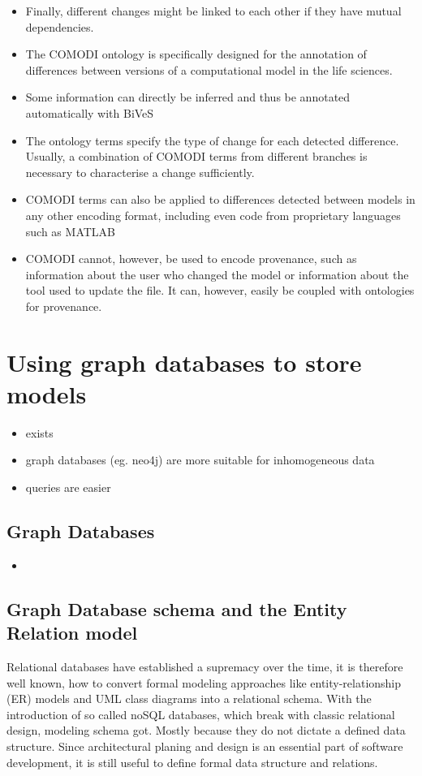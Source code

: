 \begin{itemize}
		\item Finally, different changes might be linked to each other if they have mutual dependencies.
		\item The COMODI ontology is specifically designed for the annotation of differences between versions of a computational model in the life sciences.
		\item Some information can directly be inferred and thus be annotated automatically with BiVeS
		\item  The ontology terms specify the type of change for each detected difference. Usually, a combination of COMODI terms from different branches is necessary to characterise a change sufficiently.
		\item COMODI terms can also be applied to differences detected between models in any other encoding format, including even code from proprietary languages such as MATLAB 
		\item COMODI cannot, however, be used to encode provenance, such as information about the user who changed the model or information about the tool used to update the file. It can, however, easily be coupled with ontologies for provenance.
	\end{itemize}
	
\section{Using graph databases to store \sysbio models}
	\label{sec:graph-db}
	\begin{itemize}
		\item \masymos exists
		\item graph databases (eg. neo4j) are more suitable for inhomogeneous data
		\item queries are easier
	\end{itemize}
	
	\subsection{Graph Databases}
	\begin{itemize}
		\item {}
	\end{itemize}
	
	\subsection{Graph Database schema and the Entity Relation model}
	\label{sec:graph-db:er}
	Relational databases have established a supremacy over the time, it is therefore well known, how to convert formal modeling approaches like entity-relationship (ER) models and UML class diagrams into a relational schema. With the introduction of so called noSQL databases, which break with classic relational design, modeling schema got. Mostly because they do not dictate a defined data structure.
	Since architectural planing and design is an essential part of software development, it is still useful to define formal data structure and relations.
	
